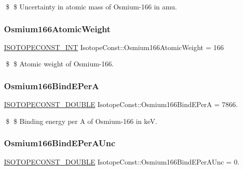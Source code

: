 \$ \$ Uncertainty in atomic mass of Osmium-\/166 in amu. \mbox{\label{group___isotope_const-_osmium-_os166_ga1a9a7adc1d5ee152aca6e8e3ae66f528}} 
\subsubsection{\texorpdfstring{Osmium166\+Atomic\+Weight}{Osmium166AtomicWeight}}
{\footnotesize\ttfamily \mbox{\hyperlink{group___isotope_const-_macros_ga5f18360b3e99483a35c32d789e62621c}{I\+S\+O\+T\+O\+P\+E\+C\+O\+N\+S\+T\+\_\+\+I\+NT}} Isotope\+Const\+::\+Osmium166\+Atomic\+Weight = 166}

\$ \$ Atomic weight of Osmium-\/166. \mbox{\label{group___isotope_const-_osmium-_os166_gaabb84b11facf7b363ca0b4bc95be44f8}} 
\subsubsection{\texorpdfstring{Osmium166\+Bind\+E\+PerA}{Osmium166BindEPerA}}
{\footnotesize\ttfamily \mbox{\hyperlink{group___isotope_const-_macros_ga8f45a7272ce02c0b4c65c44636ed719a}{I\+S\+O\+T\+O\+P\+E\+C\+O\+N\+S\+T\+\_\+\+D\+O\+U\+B\+LE}} Isotope\+Const\+::\+Osmium166\+Bind\+E\+PerA = 7866.}

\$ \$ Binding energy per A of Osmium-\/166 in keV. \mbox{\label{group___isotope_const-_osmium-_os166_ga3baa486a6b869b9d766d4d79cbf88018}} 
\subsubsection{\texorpdfstring{Osmium166\+Bind\+E\+Per\+A\+Unc}{Osmium166BindEPerAUnc}}
{\footnotesize\ttfamily \mbox{\hyperlink{group___isotope_const-_macros_ga8f45a7272ce02c0b4c65c44636ed719a}{I\+S\+O\+T\+O\+P\+E\+C\+O\+N\+S\+T\+\_\+\+D\+O\+U\+B\+LE}} Isotope\+Const\+::\+Osmium166\+Bind\+E\+Per\+A\+Unc = 0.}

